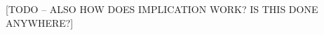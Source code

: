 \documentclass[hoptionsi,review,format=sigplan]{acmart}
\theoremstyle{definition}
\begin{document}
[TODO -- ALSO HOW DOES IMPLICATION WORK? IS THIS DONE ANYWHERE?]
























\end{document}
